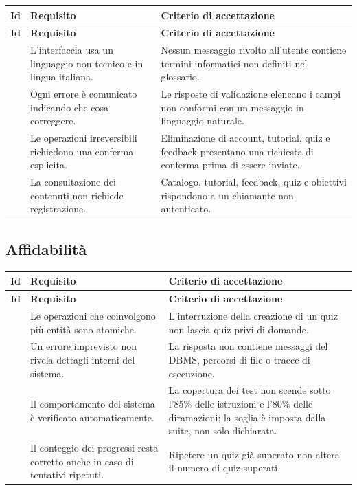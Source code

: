 \begin{longtable}{@{}l L{5.2cm} L{6.6cm}@{}}
\toprule
\textbf{Id} & \textbf{Requisito} & \textbf{Criterio di accettazione} \\
\midrule
\endfirsthead
\toprule
\textbf{Id} & \textbf{Requisito} & \textbf{Criterio di accettazione} \\
\midrule
\endhead
\bottomrule
\endlastfoot

 &
L'interfaccia usa un linguaggio non tecnico e in lingua italiana. &
Nessun messaggio rivolto all'utente contiene termini informatici non
definiti nel glossario. \\

 &
Ogni errore è comunicato indicando che cosa correggere. &
Le risposte di validazione elencano i campi non conformi con un messaggio in
linguaggio naturale. \\

 &
Le operazioni irreversibili richiedono una conferma esplicita. &
Eliminazione di account, tutorial, quiz e feedback presentano una richiesta
di conferma prima di essere inviate. \\

 &
La consultazione dei contenuti non richiede registrazione. &
Catalogo, tutorial, feedback, quiz e obiettivi rispondono  a un
chiamante non autenticato. \\

\end{longtable}

\subsection{Affidabilità}

\begin{longtable}{@{}l L{5.2cm} L{6.6cm}@{}}
\toprule
\textbf{Id} & \textbf{Requisito} & \textbf{Criterio di accettazione} \\
\midrule
\endfirsthead
\toprule
\textbf{Id} & \textbf{Requisito} & \textbf{Criterio di accettazione} \\
\midrule
\endhead
\bottomrule
\endlastfoot

 &
Le operazioni che coinvolgono più entità sono atomiche. &
L'interruzione della creazione di un quiz non lascia quiz privi di domande. \\

 &
Un errore imprevisto non rivela dettagli interni del sistema. &
La risposta  non contiene messaggi del DBMS, percorsi di file o
tracce di esecuzione. \\

 &
Il comportamento del sistema è verificato automaticamente. &
La copertura dei test non scende sotto l'85\% delle istruzioni e l'80\% delle
diramazioni; la soglia è imposta dalla suite, non solo dichiarata. \\

 &
Il conteggio dei progressi resta corretto anche in caso di tentativi
ripetuti. &
Ripetere un quiz già superato non altera il numero di quiz superati. \\

\end{longtable}

